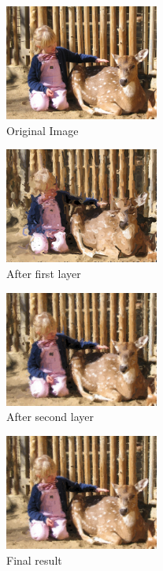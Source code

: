 \documentclass[10pt,twocolumn]{article}
\begin{document}
\begin{figure}
\centering
\centering \includegraphics[width=0.45\textwidth]{test6.jpg}
\caption{Original Image}
\end{figure}
\begin{figure}
\centering \includegraphics[width=0.45\textwidth]{paintDeer1.jpg}
\caption{After first layer}
\end{figure}
\begin{figure}
\centering \includegraphics[width=0.45\textwidth]{paintDeer2.jpg}
\caption{After second layer}
\end{figure}
\begin{figure}
\centering \includegraphics[width=0.45\textwidth]{paintDeer.jpg}
\caption{Final result}
\end{figure}
\end{document}
